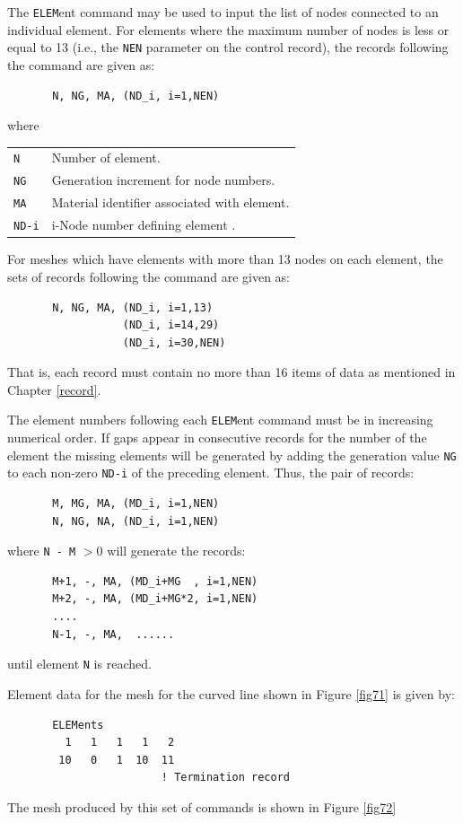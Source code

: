 The {\tt ELEM}ent command may be used to input the list of nodes connected
to an individual element.  For elements where the maximum number of
nodes is less or equal to 13 (i.e., the {\tt NEN} parameter on the
control record), the records following the command are
given as:
\begin{verbatim}
       N, NG, MA, (ND_i, i=1,NEN)
\end{verbatim}
where
\begin{center}
\begin{tabular}{ l l }
{\tt N }  & Number of element. \\
{\tt NG}  & Generation increment for node numbers. \\
{\tt MA}  & Material identifier associated with element. \\
{\tt ND-i} & i-Node number defining element . \\
\end{tabular}
\end{center}
For meshes which have elements with more than 13 nodes on each element,
the sets of records following the command are given as:
\begin{verbatim}
       N, NG, MA, (ND_i, i=1,13)
                  (ND_i, i=14,29)
                  (ND_i, i=30,NEN)
\end{verbatim}
That is, each record must contain no more than 16 items of data as mentioned
in Chapter \ref{record}.

The element numbers following each {\tt ELEM}ent command must be in increasing
numerical order.  If gaps appear in consecutive records
for the number of the element
the missing elements will be generated by adding the generation
value {\tt NG} to each non-zero {\tt ND-i} of the preceding element.  Thus,
the pair of records:
\begin{verbatim}
       M, MG, MA, (MD_i, i=1,NEN)
       N, NG, NA, (ND_i, i=1,NEN)
\end{verbatim}
where {\tt N - M} $> 0$ will generate the records:
\begin{verbatim}
       M+1, -, MA, (MD_i+MG  , i=1,NEN)
       M+2, -, MA, (MD_i+MG*2, i=1,NEN)
       ....
       N-1, -, MA,  ......
\end{verbatim}
until element {\tt N} is reached.

Element data for the mesh for the curved line shown in Figure \ref{fig71}
is given by:
\begin{verbatim}
       ELEMents
         1   1   1   1   2
        10   0   1  10  11
                        ! Termination record
\end{verbatim}
The mesh produced by this set of commands is shown in Figure \ref{fig72}


